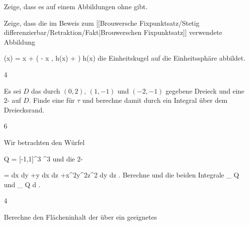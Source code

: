 {}
{

Zeige, dass es auf einem
 Abbildungen ohne
gibt.

}
{} {}

{}
{

Zeige, dass die im Beweis zum
[[Brouwersche Fixpunktsatz/Stetig differenzierbar/Retraktion/Fakt|Brouwerschen Fixpunktsatz]]
verwendete Abbildung

\mavergleichskettedisp
{\vergleichskette
{ \varphi(x)
}
{ =} { x + \left( - \left\langle  x  , h(x)  \right\rangle + \right) \cdot h(x)
}
{ } {
}
{ } {
}
{ } {
}
}
{}{}{}
 {} {}
die Einheitskugel auf die Einheitssphäre abbildet.

}
{} {}


{4}
{

Es sei $D$ das durch
$(0,2),\, (1,-1)$ und $(-2,-1)$ gegebene Dreieck und
 eine
$2$- auf $D$. Finde eine
 für $\tau$ und berechne damit
 durch ein Integral über dem Dreiecksrand.

}
{} {}

{6}
{

Wir betrachten den Würfel

\mavergleichskettedisp
{\vergleichskette
{ Q
}
{ =} { [-1,1]^3
}
{ \subseteq} { \R^3
}
{ } {
}
{ } {
}
}
{}{}{}
und die
$2$-

\mavergleichskettedisp
{\vergleichskette
{ \omega
}
{ =} { dx \wedge dy +y dx \wedge dz +x^2y^2z^2 dy \wedge dz
}
{ } {
}
{ } {
}
{ } {
}
}
{}{}{.}
Berechne
 und die beiden Integrale
\mathkor {} {\int_{  \partial Q  }   \omega} {und} {\int_{  Q  }  d \omega} {}
 {} {.}

}
{} {}

{4}
{

Berechne den Flächeninhalt der
über ein geeignetes

}
{} {}

